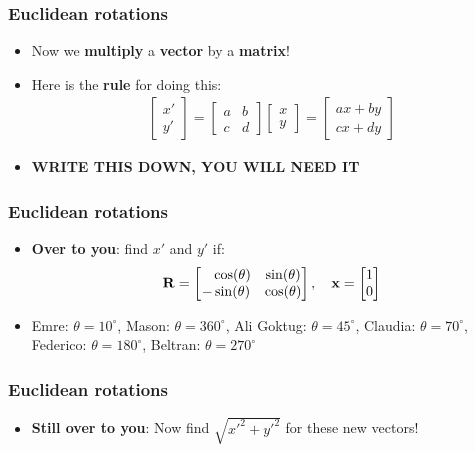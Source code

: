 \documentclass{beamer}
\begin{document}
\begin{frame}
  \frametitle{Euclidean rotations}
  \begin{itemize}
    \item<1-> Now we \textbf{multiply} a \textbf{vector} by a \textbf{matrix}!
    \item<2-> Here is the \textbf{rule} for doing this:
      \begin{align*}
	\begin{bmatrix}
	  x'\\
	  y'
	\end{bmatrix}
	=
	\begin{bmatrix}
	  a & b\\
	  c & d
	\end{bmatrix}
	\begin{bmatrix}
	  x\\
	  y
	\end{bmatrix}
	=
	\begin{bmatrix}
	 ax+by\\
	 cx+dy
	\end{bmatrix}
      \end{align*}
    \item<3-> \textbf{WRITE THIS DOWN, YOU WILL NEED IT}
  \end{itemize}
\end{frame}

\begin{frame}
  \frametitle{Euclidean rotations}
  \begin{itemize}
    \item<1-> \textbf{Over to you}: find $x'$ and $y'$ if:
      \begin{align*}
	\mathbf{R}=
	\begin{bmatrix}
	  \hphantom{-}\cos(\theta) & \sin(\theta)\\
	  -\sin(\theta) & \cos(\theta)
	\end{bmatrix}
	, \quad
	\mathbf{x}=
	\begin{bmatrix}
	  1\\
	  0
	\end{bmatrix}
      \end{align*}
    \item<2-> Emre: $\theta=10^\circ$, Mason: $\theta=360^\circ$, Ali Goktug: $\theta=45^\circ$, Claudia: $\theta=70^\circ$, Federico: $\theta=180^\circ$, Beltran: $\theta=270^\circ$
  \end{itemize}
\end{frame}

\begin{frame}
  \frametitle{Euclidean rotations}
  \begin{itemize}
    \item<1-> \textbf{Still over to you}: Now find $\sqrt{x'^2+y'^2}$ for these new vectors!
  \end{itemize}
\end{frame}
\end{document}
